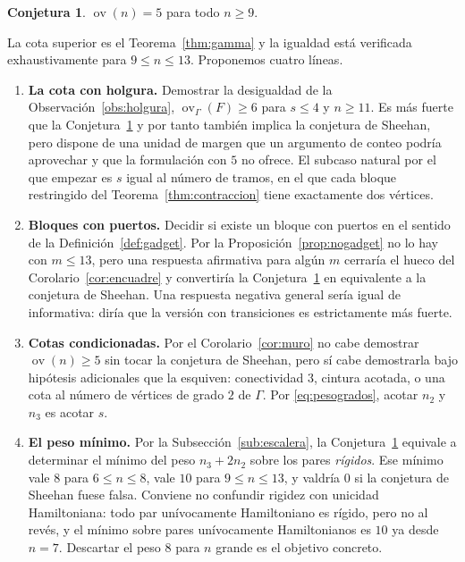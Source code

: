 \documentclass[11pt,a4paper]{article}
\theoremstyle{definition}
\newtheorem{conjetura}[teorema]{Conjetura}
\theoremstyle{remark}
\newcommand{\ov}{\operatorname{ov}}
\begin{document}
\begin{conjetura}\label{conj:principal}
$\ov(n)=5$ para todo $n\ge9$.
\end{conjetura}

La cota superior es el Teorema~\ref{thm:gamma} y la igualdad está verificada exhaustivamente para $9\le n\le13$. Proponemos cuatro líneas.

\begin{enumerate}
\item \textbf{La cota con holgura.} Demostrar la desigualdad de la Observación~\ref{obs:holgura}, $\ov_\Gamma(F)\ge6$ para $s\le4$ y $n\ge11$. Es más fuerte que la Conjetura~\ref{conj:principal} y por tanto también implica la conjetura de Sheehan, pero dispone de una unidad de margen que un argumento de conteo podría aprovechar y que la formulación con $5$ no ofrece. El subcaso natural por el que empezar es $s$ igual al número de tramos, en el que cada bloque restringido del Teorema~\ref{thm:contraccion} tiene exactamente dos vértices.
\item \textbf{Bloques con puertos.} Decidir si existe un bloque con puertos en el sentido de la Definición~\ref{def:gadget}. Por la Proposición~\ref{prop:nogadget} no lo hay con $m\le13$, pero una respuesta afirmativa para algún $m$ cerraría el hueco del Corolario~\ref{cor:encuadre} y convertiría la Conjetura~\ref{conj:principal} en equivalente a la conjetura de Sheehan. Una respuesta negativa general sería igual de informativa: diría que la versión con transiciones es estrictamente más fuerte.

\item \textbf{Cotas condicionadas.} Por el Corolario~\ref{cor:muro} no cabe demostrar $\ov(n)\ge5$ sin tocar la conjetura de Sheehan, pero sí cabe demostrarla bajo hipótesis adicionales que la esquiven: conectividad $3$, cintura acotada, o una cota al número de vértices de grado $2$ de $\Gamma$. Por \eqref{eq:pesogrados}, acotar $n_2$ y $n_3$ es acotar $s$.

\item \textbf{El peso mínimo.} Por la Subsección~\ref{sub:escalera}, la Conjetura~\ref{conj:principal} equivale a determinar el mínimo del peso $n_3+2n_2$ sobre los pares \emph{rígidos}. Ese mínimo vale $8$ para $6\le n\le8$, vale $10$ para $9\le n\le13$, y valdría $0$ si la conjetura de Sheehan fuese falsa. Conviene no confundir rigidez con unicidad Hamiltoniana: todo par unívocamente Hamiltoniano es rígido, pero no al revés, y el mínimo sobre pares unívocamente Hamiltonianos es $10$ ya desde $n=7$. Descartar el peso $8$ para $n$ grande es el objetivo concreto.
\end{enumerate}
\end{document}
